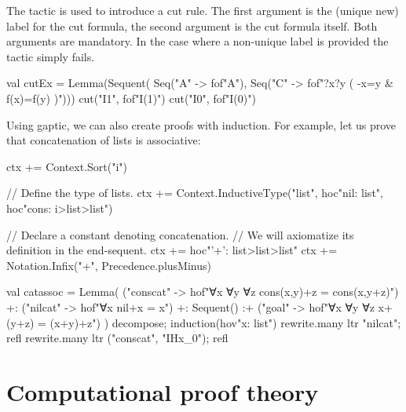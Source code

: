 \documentclass[a4paper,11pt]{book}
\newcommand{\cli}[1]{{\ttfamily {#1}}}
\begin{document}
The \cli{cut} tactic is used to introduce a cut rule. The first argument is the
(unique new) label for the cut formula, the second argument is the cut formula
itself. Both arguments are mandatory. In the case where a non-unique label is
provided the tactic simply fails.
\begin{tacticslisting}
val cutEx = Lemma(Sequent(
    Seq("A" -> fof"A"),
    Seq("C" -> fof"?x?y ( -x=y & f(x)=f(y) )"))) {
  cut("I1", fof"I(1)")
  cut("I0", fof"I(0)")
}
\end{tacticslisting}

Using gaptic, we can also create proofs with induction.  For example, let us
prove that concatenation of lists is associative:

\begin{tacticslisting}[nosig]
ctx += Context.Sort("i")

// Define the type of lists.
ctx += Context.InductiveType("list",
  hoc"nil: list",
  hoc"cons: i>list>list")

// Declare a constant denoting concatenation.
// We will axiomatize its definition in the end-sequent.
ctx += hoc"'+': list>list>list"
ctx += Notation.Infix("+", Precedence.plusMinus)

val catassoc =
  Lemma(
      ("conscat" -> hof"∀x ∀y ∀z cons(x,y)+z = cons(x,y+z)") +:
      ("nilcat" -> hof"∀x nil+x = x") +:
      Sequent()
      :+ ("goal" -> hof"∀x ∀y ∀z x+(y+z) = (x+y)+z")
    ) {
  decompose; induction(hov"x: list")
  rewrite.many ltr "nilcat"; refl
  rewrite.many ltr ("conscat", "IHx_0"); refl
}
\end{tacticslisting}
\begin{tacticsoutput}
\end{tacticsoutput}


\chapter{Computational proof theory}
\end{document}
